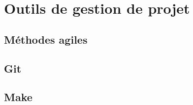 \section{Outils de gestion de projet}

\subsection{Méthodes agiles}



\subsection{Git}

\subsection{Make}

